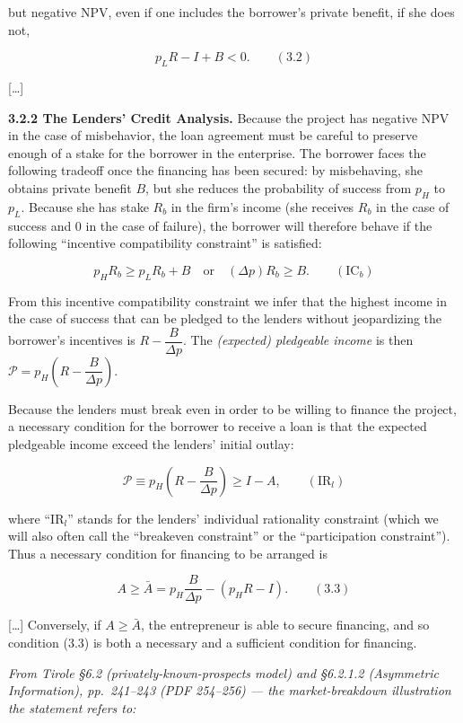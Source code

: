 \documentclass[11pt,a4paper]{article}
\begin{document}
but negative NPV, even if one includes the borrower's private benefit, if she does not,

\[p_L R - I + B < 0. \qquad (3.2)\]

{[}\ldots{]}

\textbf{3.2.2 The Lenders' Credit Analysis.} Because the project has negative NPV in the case of
misbehavior, the loan agreement must be careful to preserve enough of a stake for the borrower in
the enterprise. The borrower faces the following tradeoff once the financing has been secured: by
misbehaving, she obtains private benefit \(B\), but she reduces the probability of success from
\(p_H\) to \(p_L\). Because she has stake \(R_b\) in the firm's income (she receives \(R_b\) in the
case of success and 0 in the case of failure), the borrower will therefore behave if the following
``incentive compatibility constraint'' is satisfied:

\[p_H R_b \geqslant p_L R_b + B \quad \text{or} \quad (\Delta p) R_b \geqslant B. \qquad (\text{IC}_b)\]

From this incentive compatibility constraint we infer that the highest income in the case of success
that can be pledged to the lenders without jeopardizing the borrower's incentives is
\(R - \dfrac{B}{\Delta p}\). The \emph{(expected) pledgeable income} is then
\(\mathcal{P} = p_H\left(R - \dfrac{B}{\Delta p}\right)\).

Because the lenders must break even in order to be willing to finance the project, a necessary
condition for the borrower to receive a loan is that the expected pledgeable income exceed the
lenders' initial outlay:

\[\mathcal{P} \equiv p_H\left(R - \frac{B}{\Delta p}\right) \geqslant I - A, \qquad (\text{IR}_l)\]

where ``IR\(_l\)'' stands for the lenders' individual rationality constraint (which we will also
often call the ``breakeven constraint'' or the ``participation constraint''). Thus a necessary
condition for financing to be arranged is

\[A \geqslant \bar{A} = p_H \frac{B}{\Delta p} - (p_H R - I). \qquad (3.3)\]

{[}\ldots{]} Conversely, if \(A \geqslant \bar{A}\), the entrepreneur is able to secure financing,
and so condition (3.3) is both a necessary and a sufficient condition for financing.

\emph{From Tirole §6.2 (privately-known-prospects model) and §6.2.1.2 (Asymmetric Information),
pp.~241--243 (PDF 254--256) --- the market-breakdown illustration the statement refers to:}
\end{document}
